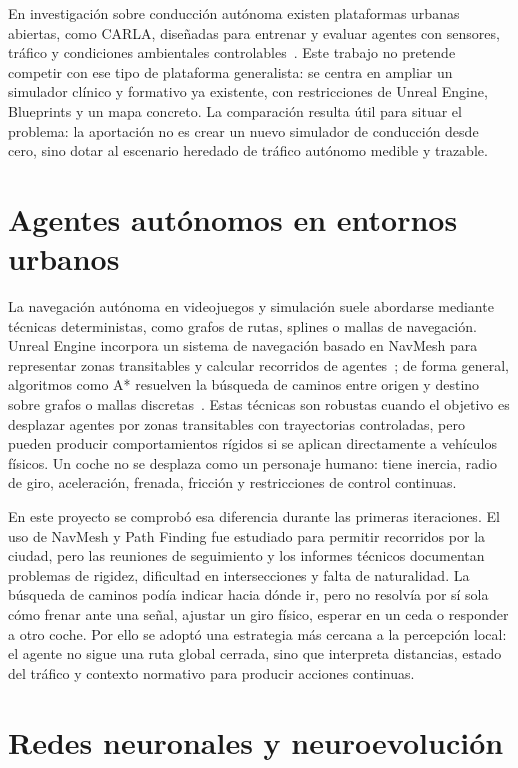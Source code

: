 En investigación sobre conducción autónoma existen plataformas urbanas abiertas, como CARLA, diseñadas para entrenar y evaluar agentes con sensores, tráfico y condiciones ambientales controlables~\cite{carla}. Este trabajo no pretende competir con ese tipo de plataforma generalista: se centra en ampliar un simulador clínico y formativo ya existente, con restricciones de Unreal Engine, Blueprints y un mapa concreto. La comparación resulta útil para situar el problema: la aportación no es crear un nuevo simulador de conducción desde cero, sino dotar al escenario heredado de tráfico autónomo medible y trazable.

\section{Agentes autónomos en entornos urbanos}

La navegación autónoma en videojuegos y simulación suele abordarse mediante técnicas deterministas, como grafos de rutas, splines o mallas de navegación. Unreal Engine incorpora un sistema de navegación basado en NavMesh para representar zonas transitables y calcular recorridos de agentes~\cite{unrealnavigation}; de forma general, algoritmos como A* resuelven la búsqueda de caminos entre origen y destino sobre grafos o mallas discretas~\cite{redblobpathfinding}. Estas técnicas son robustas cuando el objetivo es desplazar agentes por zonas transitables con trayectorias controladas, pero pueden producir comportamientos rígidos si se aplican directamente a vehículos físicos. Un coche no se desplaza como un personaje humano: tiene inercia, radio de giro, aceleración, frenada, fricción y restricciones de control continuas.

En este proyecto se comprobó esa diferencia durante las primeras iteraciones. El uso de NavMesh y Path Finding fue estudiado para permitir recorridos por la ciudad, pero las reuniones de seguimiento y los informes técnicos documentan problemas de rigidez, dificultad en intersecciones y falta de naturalidad. La búsqueda de caminos podía indicar hacia dónde ir, pero no resolvía por sí sola cómo frenar ante una señal, ajustar un giro físico, esperar en un ceda o responder a otro coche. Por ello se adoptó una estrategia más cercana a la percepción local: el agente no sigue una ruta global cerrada, sino que interpreta distancias, estado del tráfico y contexto normativo para producir acciones continuas.

\section{Redes neuronales y neuroevolución}

